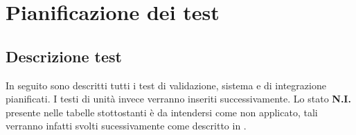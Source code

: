 %


\section{Pianificazione dei test}
	\subsection{Descrizione test}
		In seguito sono descritti tutti i test di validazione, sistema e di integrazione pianificati. I testi di unità invece verranno inseriti successivamente.
Lo stato \textbf{N.I.} presente nelle tabelle stottostanti è da intendersi come non applicato, tali verranno infatti svolti sucessivamente come descritto in \docNamePdP.